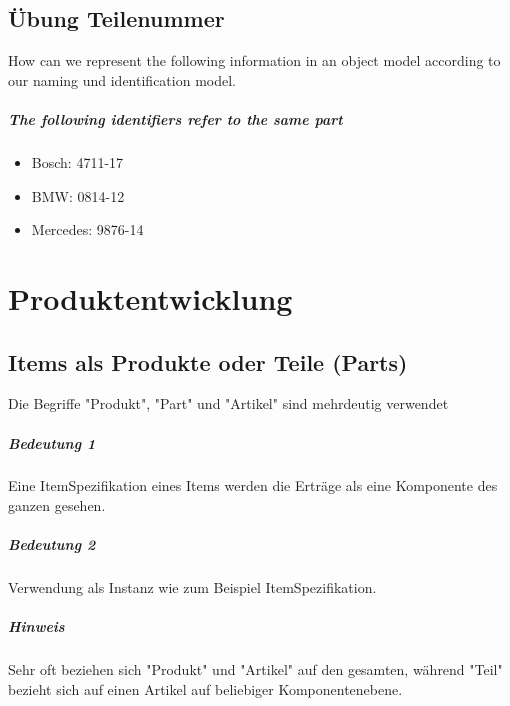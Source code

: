\newpage
\section{Übung Teilenummer}

How can we represent the following information in an object model according to our naming und identification model.

\paragraph{The following identifiers refer to the same part}
\begin{itemize}
\item Bosch: 4711-17
\item BMW: 0814-12
\item Mercedes: 9876-14
\end{itemize}


\chapter{Produktentwicklung}

\section{Items als Produkte oder Teile (Parts)}
Die Begriffe "Produkt", "Part" und "Artikel" sind mehrdeutig verwendet 

\paragraph{Bedeutung 1}
Eine ItemSpezifikation eines Items werden die Erträge als eine Komponente des ganzen gesehen.

\paragraph{Bedeutung 2}
Verwendung als Instanz wie zum Beispiel ItemSpezifikation.

\paragraph{Hinweis}
Sehr oft beziehen sich "Produkt" und "Artikel" auf den gesamten, während "Teil" bezieht sich auf einen Artikel auf beliebiger Komponentenebene.


